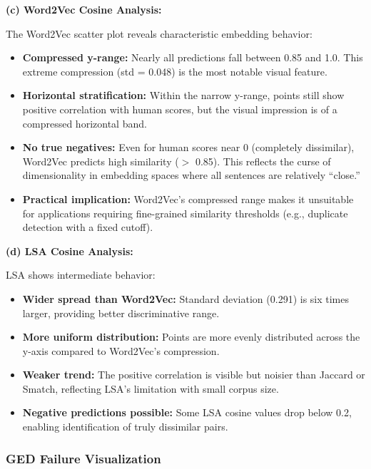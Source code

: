 \documentclass[11pt,a4paper]{article}
\begin{document}
\textbf{(c) Word2Vec Cosine Analysis:}

The Word2Vec scatter plot reveals characteristic embedding behavior:
\begin{itemize}
    \item \textbf{Compressed y-range:} Nearly all predictions fall between 0.85 and 1.0. This extreme compression (std = 0.048) is the most notable visual feature.
    
    \item \textbf{Horizontal stratification:} Within the narrow y-range, points still show positive correlation with human scores, but the visual impression is of a compressed horizontal band.
    
    \item \textbf{No true negatives:} Even for human scores near 0 (completely dissimilar), Word2Vec predicts high similarity ($>$ 0.85). This reflects the curse of dimensionality in embedding spaces where all sentences are relatively ``close.''
    
    \item \textbf{Practical implication:} Word2Vec's compressed range makes it unsuitable for applications requiring fine-grained similarity thresholds (e.g., duplicate detection with a fixed cutoff).
\end{itemize}

\textbf{(d) LSA Cosine Analysis:}

LSA shows intermediate behavior:
\begin{itemize}
    \item \textbf{Wider spread than Word2Vec:} Standard deviation (0.291) is six times larger, providing better discriminative range.
    
    \item \textbf{More uniform distribution:} Points are more evenly distributed across the y-axis compared to Word2Vec's compression.
    
    \item \textbf{Weaker trend:} The positive correlation is visible but noisier than Jaccard or Smatch, reflecting LSA's limitation with small corpus size.
    
    \item \textbf{Negative predictions possible:} Some LSA cosine values drop below 0.2, enabling identification of truly dissimilar pairs.
\end{itemize}

\subsubsection{GED Failure Visualization}
\end{document}
